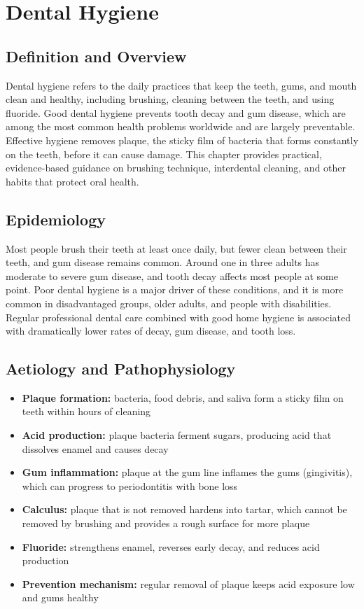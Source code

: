 \chapter{Dental Hygiene}

\section*{Definition and Overview}
Dental hygiene refers to the daily practices that keep the teeth, gums, and mouth clean and healthy, including brushing, cleaning between the teeth, and using fluoride. Good dental hygiene prevents tooth decay and gum disease, which are among the most common health problems worldwide and are largely preventable. Effective hygiene removes plaque, the sticky film of bacteria that forms constantly on the teeth, before it can cause damage. This chapter provides practical, evidence-based guidance on brushing technique, interdental cleaning, and other habits that protect oral health.

\section*{Epidemiology}
Most people brush their teeth at least once daily, but fewer clean between their teeth, and gum disease remains common. Around one in three adults has moderate to severe gum disease, and tooth decay affects most people at some point. Poor dental hygiene is a major driver of these conditions, and it is more common in disadvantaged groups, older adults, and people with disabilities. Regular professional dental care combined with good home hygiene is associated with dramatically lower rates of decay, gum disease, and tooth loss.

\section*{Aetiology and Pathophysiology}
\begin{itemize}
    \item \textbf{Plaque formation:} bacteria, food debris, and saliva form a sticky film on teeth within hours of cleaning
    \item \textbf{Acid production:} plaque bacteria ferment sugars, producing acid that dissolves enamel and causes decay
    \item \textbf{Gum inflammation:} plaque at the gum line inflames the gums (gingivitis), which can progress to periodontitis with bone loss
    \item \textbf{Calculus:} plaque that is not removed hardens into tartar, which cannot be removed by brushing and provides a rough surface for more plaque
    \item \textbf{Fluoride:} strengthens enamel, reverses early decay, and reduces acid production
    \item \textbf{Prevention mechanism:} regular removal of plaque keeps acid exposure low and gums healthy
\end{itemize}

